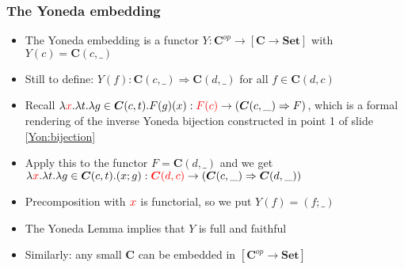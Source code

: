 \documentclass[handout]{beamer}
\newcommand{\To}{\Rightarrow}
\newcommand{\bfsf}[1]{{\boldsymbol{#1}}}
\newcommand{\Set}{\bfsf{Set}}
\newcommand{\CC}{\bfsf{C}}
\begin{document}
\frame
  {   
    \frametitle{The Yoneda embedding}\label{Yon:Embed}

 \begin{itemize}[<+->]
\item The Yoneda embedding is a functor $Y: \CC^{op} \to [\CC\to\Set]$
with $Y(c)=\CC(c,\_)$
\item Still to define: $Y(f):\CC(c,\_)\To\CC(d,\_)$ for all $f\in\CC(d,c)$
\item Recall $\lambda {\color{red}x}.\lambda t. \lambda g\in\CC(c,t). F(g)(x) : {\color{red}F(c)} \to (\CC(c,\_)\To F)$,
which is a formal rendering of the inverse Yoneda bijection constructed in
point 1 of slide \ref{Yon:bijection}
\item Apply this to the functor $F= \CC(d,\_)$ and we get
$\lambda {\color{red}x}.\lambda t. \lambda g\in\CC(c,t). (x;g) : {\color{red}\CC(d,c)} \to (\CC(c,\_)\To \CC(d,\_))$
\item Precomposition with ${\color{red}x}$ is functorial, so we put $Y(f)= (f;\_)$
\item The Yoneda Lemma implies that $Y$ is full and faithful
\item Similarly: any small $\CC$ can be embedded in $[\CC^{op}\to\Set]$
 \end{itemize}

 }
\end{document}
